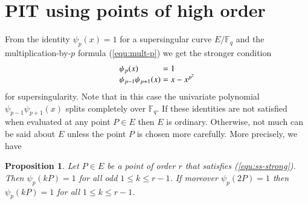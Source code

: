 \documentclass[review]{elsarticle}
\theoremstyle{plain}
\newtheorem{proposition}[theorem]{Proposition}
\theoremstyle{definition}
\def\F{\ensuremath{\mathbb{F}}}
\begin{document}


\section{PIT using points of high order}
\label{sec:pit-h-order}

From the identity $\psi_p(x) = 1$ for a supersingular curve $E/\F_q$ and the multiplication-by-$p$ 
formula (\ref{equ:mult-p}) we get the stronger condition
\begin{equation}
\label{equ:ss-strong}
	\arraycolsep=1.4pt
	\begin{array}{lll}
		\psi_p(x) & = & 1 \\
		\psi_{p - 1}\psi_{p + 1}(x) & = & x - x^{p^2}
	\end{array}
\end{equation}
for supersingularity. Note that in this case the univariate polynomial $\psi_{p - 1}\psi_{p + 
1}(x)$ splits completely over $\F_q$. If these identities are not satisfied when evaluated at any 
point $P \in E$ then $E$ is ordinary. Otherwise, not much can be said about $E$ unless the point 
$P$ is chosen more carefully. More precisely, we have
\begin{proposition}
	Let $P \in E$ be a point of order $r$ that satisfies (\ref{equ:ss-strong}). Then $\psi_p(kP) 
	= 1$ for all odd $1 \le k \le r - 1$. If moreover $\psi_p(2P) = 1$ then $\psi_p(kP) = 1$ for 
	all $1 \le k \le r - 1$.
\end{proposition}
\end{document}
